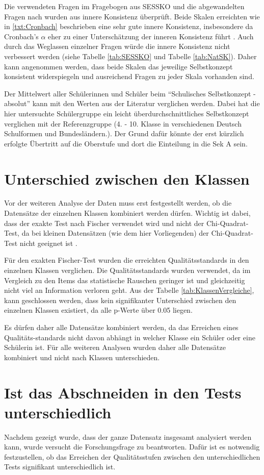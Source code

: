 Die verwendeten Fragen im Fragebogen aus SESSKO \citep{Schone2002} und die abgewandelten Fragen nach \citet{Dierks2014} wurden aus innere Konsistenz überprüft. Beide Skalen erreichten wie in \ref{txt:Cronbach} beschrieben eine sehr gute innere Konsistenz, insbesondere da Cronbach's $\alpha$ eher zu einer Unterschätzung der inneren Konsistenz führt \citep{Eisinga2013}. Auch durch das Weglassen einzelner Fragen würde die innere Konsistenz nicht verbessert werden (siehe Tabelle \ref{tab:SESSKO} und Tabelle \ref{tab:NatSK}). Daher kann angenommen werden, dass beide Skalen das jeweilige Selbstkonzept konsistent widerspiegeln und ausreichend Fragen zu jeder Skala vorhanden sind. 

Der Mittelwert aller Schülerinnen und Schüler beim "`Schulisches Selbstkonzept - absolut"' kann mit den Werten aus der Literatur \citep{Schone2002} verglichen werden. Dabei hat die hier untersuchte Schülergruppe ein leicht überdurchschnittliches Selbstkonzept verglichen mit der Referenzgruppe (4. - 10. Klasse in verschiedenen Deutsch Schulformen und Bundesländern.). Der Grund dafür könnte der erst kürzlich erfolgte Übertritt auf die Oberstufe und dort die Einteilung in die Sek A sein. 

\section{Unterschied zwischen den Klassen}

Vor der weiteren Analyse der Daten muss erst festgestellt werden, ob die Datensätze der einzelnen Klassen kombiniert werden dürfen. Wichtig ist dabei, dass der exakte Test nach Fischer verwendet wird und nicht der Chi-Quadrat-Test, da bei kleinen Datensätzen (wie dem hier Vorliegenden) der Chi-Quadrat-Test nicht geeignet ist \citep{Mehta1984}.

Für den exakten Fischer-Test wurden die erreichten Qualitätsstandards in den einzelnen Klassen verglichen. Die Qualitätsstandards wurden verwendet, da im Vergleich zu den Items das statistische Rauschen geringer ist und gleichzeitig nicht viel an Information verloren geht. Aus der Tabelle \ref{tab:KlassenVergleiche}, kann geschlossen werden, dass kein signifikanter Unterschied zwischen den einzelnen Klassen existiert, da alle p-Werte über 0.05 liegen.

Es dürfen daher alle Datensätze kombiniert werden, da das Erreichen eines Qualitäts-standards nicht davon abhängt in welcher Klasse ein Schüler oder eine Schülerin ist. Für alle weiteren Analysen wurden daher alle Datensätze kombiniert und nicht nach Klassen unterschieden.

\section{Ist das Abschneiden in den Tests unterschiedlich}

Nachdem gezeigt wurde, dass der ganze Datensatz insgesamt analysiert werden kann, wurde versucht die Forschungsfrage zu beantworten. Dafür ist es notwendig festzustellen, ob das Erreichen der Qualitätsstufen zwischen den unterschiedlichen Tests signifikant unterschiedlich ist.
